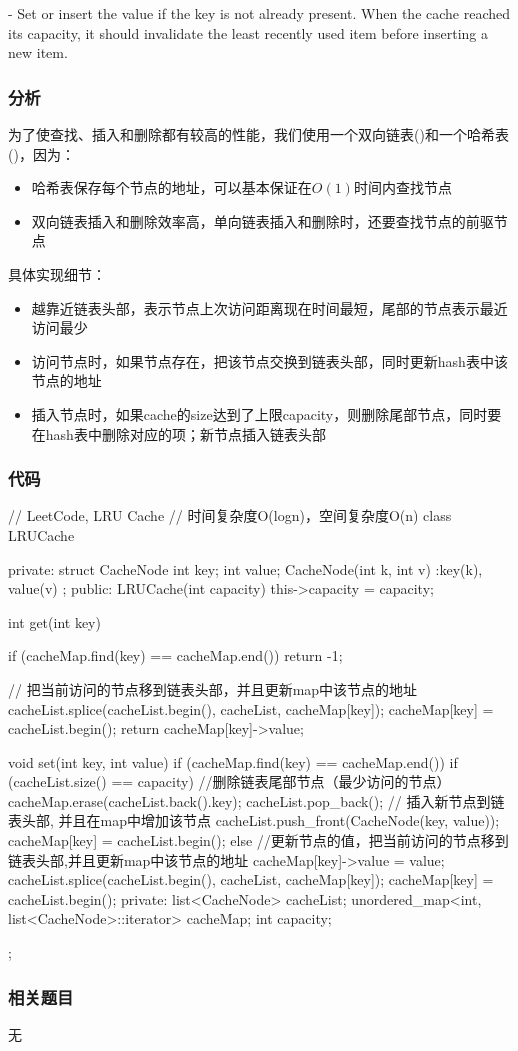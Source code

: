  - Set or insert the value if the key is not already 
present. When the cache reached its capacity, it should invalidate the least 
recently used item before inserting a new item.


\subsubsection{分析}
为了使查找、插入和删除都有较高的性能，我们使用一个双向链表()和一个哈希表()，因为：
\begin{itemize}
	\item{哈希表保存每个节点的地址，可以基本保证在$O(1)$时间内查找节点}
	\item{双向链表插入和删除效率高，单向链表插入和删除时，还要查找节点的前驱节点}
\end{itemize}

具体实现细节：
\begin{itemize}
	\item{越靠近链表头部，表示节点上次访问距离现在时间最短，尾部的节点表示最近访问最少}
	\item{访问节点时，如果节点存在，把该节点交换到链表头部，同时更新hash表中该节点的地址}
	\item{插入节点时，如果cache的size达到了上限capacity，则删除尾部节点，同时要在hash表中删除对应的项；新节点插入链表头部}
	              
\end{itemize}


\subsubsection{代码}
\begin{Code}
	// LeetCode, LRU Cache
	// 时间复杂度O(logn)，空间复杂度O(n)
	class LRUCache{
		private:
		struct CacheNode {
			int key;
			int value;
			CacheNode(int k, int v) :key(k), value(v){}
		};
		public:
		LRUCache(int capacity) {
			this->capacity = capacity;
		}
		
		int get(int key) {
			if (cacheMap.find(key) == cacheMap.end()) return -1;
			
			// 把当前访问的节点移到链表头部，并且更新map中该节点的地址
			cacheList.splice(cacheList.begin(), cacheList, cacheMap[key]); 
			cacheMap[key] = cacheList.begin();
			return cacheMap[key]->value;
		}
		
		void set(int key, int value) {
			if (cacheMap.find(key) == cacheMap.end()) {
				if (cacheList.size() == capacity) { //删除链表尾部节点（最少访问的节点）
					cacheMap.erase(cacheList.back().key);
					cacheList.pop_back();
				}
				// 插入新节点到链表头部, 并且在map中增加该节点
				cacheList.push_front(CacheNode(key, value));
				cacheMap[key] = cacheList.begin();
			} else {
			//更新节点的值，把当前访问的节点移到链表头部,并且更新map中该节点的地址
			cacheMap[key]->value = value;
			cacheList.splice(cacheList.begin(), cacheList, cacheMap[key]);
			cacheMap[key] = cacheList.begin();
		}
	}
	private:
	list<CacheNode> cacheList;
	unordered_map<int, list<CacheNode>::iterator> cacheMap;
	int capacity;
};
\end{Code}


\subsubsection{相关题目}
\begindot
\item 无
\myenddot

\